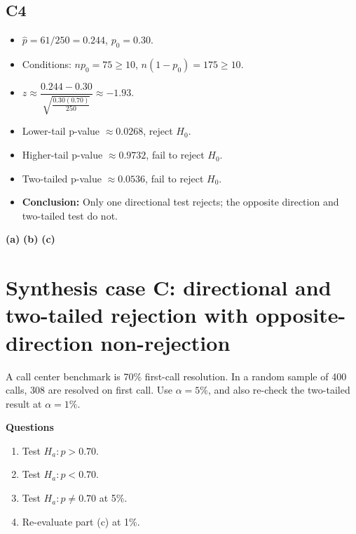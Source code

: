 \subsection*{C4}
\begin{itemize}
    \item \(\hat p=61/250=0.244\), \(p_0=0.30\).
    \item Conditions: \(np_0=75\ge10\), \(n(1-p_0)=175\ge10\).
    \item \(z\approx \dfrac{0.244-0.30}{\sqrt{\frac{0.30(0.70)}{250}}}\approx -1.93\).
    \item Lower-tail p-value \(\approx 0.0268\), reject \(H_0\).
    \item Higher-tail p-value \(\approx 0.9732\), fail to reject \(H_0\).
    \item Two-tailed p-value \(\approx 0.0536\), fail to reject \(H_0\).
    \item \textbf{Conclusion:} Only one directional test rejects; the opposite direction and two-tailed test do not.
\end{itemize}

\begin{center}
\textbf{(a)}\;
\hspace{0.5cm}
\textbf{(b)}\;
\hspace{0.5cm}
\textbf{(c)}\;
\end{center}


\section{Synthesis case C: directional and two-tailed rejection with opposite-direction non-rejection}
A call center benchmark is 70\% first-call resolution. In a random sample of 400 calls, 308 are resolved on first call. Use \(\alpha=5\%\), and also re-check the two-tailed result at \(\alpha=1\%\).

\textbf{Questions}
\begin{enumerate}
    \item[(a)] Test \(H_a\colon p>0.70\).
    \item[(b)] Test \(H_a\colon p<0.70\).
    \item[(c)] Test \(H_a\colon p\ne0.70\) at 5\%.
    \item[(d)] Re-evaluate part (c) at 1\%.
\end{enumerate}

